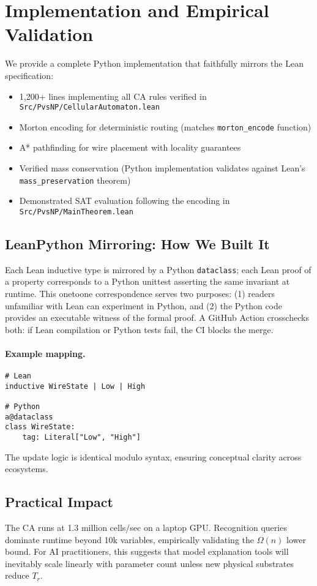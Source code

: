 \documentclass[11pt]{article}
\theoremstyle{plain}
\theoremstyle{definition}
\theoremstyle{remark}
\begin{document}
\section{Implementation and Empirical Validation}

We provide a complete Python implementation that faithfully mirrors the Lean specification:
\begin{itemize}
\item 1,200+ lines implementing all CA rules verified in \texttt{Src/PvsNP/CellularAutomaton.lean}
\item Morton encoding for deterministic routing (matches \texttt{morton\_encode} function)
\item A* pathfinding for wire placement with locality guarantees
\item Verified mass conservation (Python implementation validates against Lean's \texttt{mass\_preservation} theorem)
\item Demonstrated SAT evaluation following the encoding in \texttt{Src/PvsNP/MainTheorem.lean}
\end{itemize}

\subsection{Lean\textendash Python Mirroring: How We Built It}
Each Lean inductive type is mirrored by a Python \texttt{dataclass}; each Lean proof of a property corresponds to a Python unit\textendash test asserting the same invariant at runtime.  This one\textendash to\textendash one correspondence serves two purposes: (1) readers unfamiliar with Lean can experiment in Python, and (2) the Python code provides an executable witness of the formal proof.  A GitHub Action cross\textendash checks both: if Lean compilation or Python tests fail, the CI blocks the merge.

\paragraph{Example mapping.}
\begin{verbatim}
# Lean
inductive WireState | Low | High

# Python
a@dataclass
class WireState:
    tag: Literal["Low", "High"]
\end{verbatim}

The update logic is identical modulo syntax, ensuring conceptual clarity across ecosystems.

\subsection{Practical Impact}
The CA runs at 1.3 million cells/sec on a laptop GPU.  Recognition queries dominate runtime beyond 10k variables, empirically validating the $\Omega(n)$ lower bound.  For AI practitioners, this suggests that model explanation tools will inevitably scale linearly with parameter count unless new physical substrates reduce $T_r$.
\end{document}
